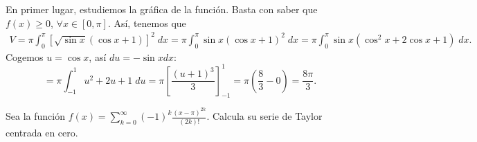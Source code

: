 \documentclass{article}
\begin{document}
\begin{sol}
	En primer lugar, estudiemos la gráfica de la función. Basta con saber que $\displaystyle f\left(x\right) \geq 0 $, $\displaystyle \forall x \in \left[0,\pi \right]  $. Así, tenemos que
\[
\begin{split}
	V = \pi \int^{\pi }_{0} \left[\sqrt{\sin x}\left(\cos x + 1\right)\right] ^{2} \; dx = \pi \int^{\pi }_{0} \sin x \left(\cos x + 1\right)^{2} \; dx = \pi \int^{\pi }_{0} \sin x\left(\cos ^{2}x +2\cos x+1\right) \; dx .
\end{split}
\]
Cogemos $\displaystyle u = \cos x $, así $\displaystyle du = - \sin x dx $:
\[ = \pi \int^{1}_{-1} u^{2}+2u+1 \; du = \pi \left[\frac{\left(u+1\right)^{3}}{3}\right]^{1}_{-1} = \pi\left(\frac{8}{3}-0\right) = \frac{8\pi }{3}.\]
\end{sol}
\begin{ej}
Sea la función $\displaystyle f\left(x\right) = \sum^{\infty}_{k = 0}\left(-1\right)^{k}\frac{\left(x-\pi \right)^{2k}}{\left(2k\right)!} $. Calcula su serie de Taylor centrada en cero.
\end{ej}
\begin{sol}

\end{sol}
\end{document}
